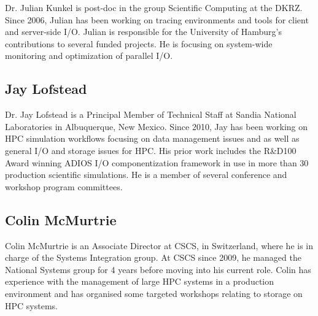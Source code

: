 \documentclass[a4paper,10pt]{article}
\begin{document}
Dr. Julian Kunkel is post-doc in the group Scientific Computing at the DKRZ.
Since 2006, Julian has been working on tracing environments and tools for client and server-side I/O.
Julian is responsible for the University of Hamburg's contributions to several funded projects.  
He is focusing on system-wide monitoring and optimization of parallel I/O.

\subsection{Jay Lofstead}
Dr. Jay Lofstead is a Principal Member of Technical Staff at Sandia National
Laboratories in Albuquerque, New Mexico. Since 2010, Jay has been working on
HPC simulation workflows focusing on data management issues and as well as
general I/O and storage issues for HPC.  His prior work includes the R\&D100
Award winning ADIOS I/O componentization framework in use in more than 30
production scientific simulations. He is a member of several conference and
workshop program committees.

\subsection{Colin McMurtrie}
Colin McMurtrie is an Associate Director at CSCS, in Switzerland, where he is in charge of the Systems Integration group.  At CSCS since 2009, he managed the National Systems group for 4 years before moving into his current role.  Colin has experience with the management of large HPC systems in a production environment and has organised some targeted workshops relating to storage on HPC systems.
\end{document}
